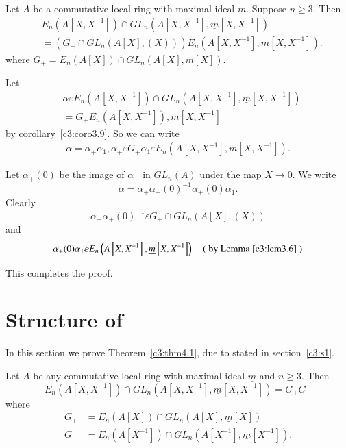 \begin{coro}\label{c3:coro3.10}
Let $A$ be a commutative local ring with maximal ideal
$\underline{m}$. Suppose $n\geq 3$. Then 
$$
\begin{aligned}
&E_n\left(A\left[X,X^{-1}\right]\right)\cap
GL_n\left(A\left[X,X^{-1}\right],\underline{m}\left[X,X^{-1}\right]\right)\\
&{}=\left(G_+\cap GL_n(A[X],(X))\right) E_n\left(A\left[X,X^{-1}\right],\underline{m}\left[X,X^{-1}\right]\right).
\end{aligned}
$$
where $G_+=E_n(A[X])\cap GL_n(A[X],\underline{m}[X]).$
\end{coro}

\begin{Proof}
Let 
$$
\begin{aligned}
&\alpha \varepsilon E_n\left(A\left[X,X^{-1}\right]\right)\cap
GL_n\left(A\left[X,X^{-1}\right],\underline{m}\left[X,X^{-1}\right]\right)\\
&{}=G_+E_n\left(A\left[X,X^{-1}\right]\right),\underline{m}\left[X,X^{-1}\right]
\end{aligned}
$$
by corollary~\ref{c3:coro3.9}. So we can write
$$
\begin{aligned}
\alpha=\alpha_+\alpha_1,\alpha_+\varepsilon G_+\alpha_1 \varepsilon
E_n\left(A\left[X,X^{-1}\right],\underline{m}\left[X,X^{-1}\right]\right).
\end{aligned}
$$

Let $\alpha_+(0)$ be the image of $\alpha_+$ in $GL_n(A)$ under the
map $X\rightarrow 0$. We write 
$$
\alpha=\alpha_+\alpha_+(0)^{-1}\alpha_+(0)\alpha_1.
$$
Clearly
$$
\alpha_+\alpha_+(0)^{-1}\varepsilon G_+\cap GL_n(A[X],(X))
$$
and 
$$
\alpha_+(0)\alpha_1\varepsilon
E_n\left(A\left[X,X^{-1}\right],\underline{m}\left[X,X^{-1}\right]\right)\quad(\text{
  by Lemma~\ref{c3:lem3.6} })
$$

This completes the proof.
\enprf
\end{Proof}


\section{Structure of \texorpdfstring{\protect\eq}{eq}}\label{c3:s4}  
 
In this section we prove Theorem~\ref{c3:thm4.1}, due to
\citeauthor{Suslina}\cite{Suslina} stated in section~\ref{c3:s1}.


\begin{thm}\label{c3:thm4.1}
Let $A$ be any commutative local ring with maximal ideal
$\underline{m}$ and $n\geq 3$. Then 
$$
E_n\left(A\left[X,X^{-1}\right]\right)\cap GL_n\left(A\left[X,X^{-1}\right],\underline{m}\left[X,X^{-1}\right]\right)=G_+G_-
$$
where
\begin{align*}
G_+&=E_n(A[X])\cap GL_n(A[X],\underline{m}[X])\\
G_-&=E_n\left(A\left[X^{-1}\right]\right)\cap GL_n\left(A\left[X^{-1}\right],\underline{m}\left[X^{-1}\right]\right).
\end{align*}
\end{thm}

